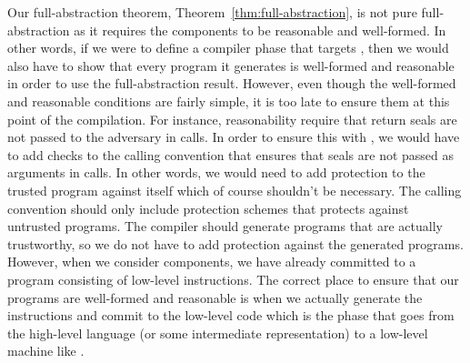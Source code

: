 \begin{jversion}
  Our full-abstraction theorem, Theorem~\ref{thm:full-abstraction}, is not pure full-abstraction as it requires the components to be reasonable and well-formed.
  In other words, if we were to define a compiler phase that targets \srccm{}, then we would also have to show that every program it generates is well-formed and reasonable in order to use the full-abstraction result.
  However, even though the well-formed and reasonable conditions are fairly simple, it is too late to ensure them at this point of the compilation.
  For instance, reasonability require that return seals are not passed to the adversary in calls.
  In order to ensure this with \stktokens{}, we would have to add checks to the calling convention that ensures that seals are not passed as arguments in calls.
  In other words, we would need to add protection to the trusted program against itself which of course shouldn't be necessary.
  The calling convention should only include protection schemes that protects against untrusted programs.
  The compiler should generate programs that are actually trustworthy, so we do not have to add protection against the generated programs.
  However, when we consider \srccm{} components, we have already committed to a program consisting of low-level instructions.
  The correct place to ensure that our programs are well-formed and reasonable is when we actually generate the instructions and commit to the low-level code which is the phase that goes from the high-level language (or some intermediate representation) to a low-level machine like \srccm{}.




\end{jversion}



